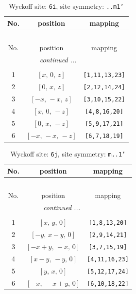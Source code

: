 \documentclass[fleqn,8pt]{jsarticle}
\begin{document}
\renewcommand{\arraystretch}{1.2}
\begin{longtable}{ccc}
\caption{Wyckoff site: {\tt 6i}, site symmetry: {\tt ..m1'}}
 \\
 \hline \hline
No. & position & mapping \\ \hline \endfirsthead

\multicolumn{2}{l}{\tablename\ \thetable{}} \\
 \hline \hline
No. & position & mapping \\ \hline \endhead

 \hline \hline
\multicolumn{2}{r}{\footnotesize\it continued ...} \\ \endfoot

 \hline \hline
\multicolumn{2}{r}{} \\ \endlastfoot

1 & $\left[ x,\, 0,\, z \right]$ & {\tt [1,11,13,23]} \\ \hline
2 & $\left[ 0,\, x,\, z \right]$ & {\tt [2,12,14,24]} \\ \hline
3 & $\left[ - x,\, - x,\, z \right]$ & {\tt [3,10,15,22]} \\ \hline
4 & $\left[ x,\, 0,\, - z \right]$ & {\tt [4,8,16,20]} \\ \hline
5 & $\left[ 0,\, x,\, - z \right]$ & {\tt [5,9,17,21]} \\ \hline
6 & $\left[ - x,\, - x,\, - z \right]$ & {\tt [6,7,18,19]} \\
\end{longtable}
\renewcommand{\arraystretch}{1.2}
\begin{longtable}{ccc}
\caption{Wyckoff site: {\tt 6j}, site symmetry: {\tt m..1'}}
 \\
 \hline \hline
No. & position & mapping \\ \hline \endfirsthead

\multicolumn{2}{l}{\tablename\ \thetable{}} \\
 \hline \hline
No. & position & mapping \\ \hline \endhead

 \hline \hline
\multicolumn{2}{r}{\footnotesize\it continued ...} \\ \endfoot

 \hline \hline
\multicolumn{2}{r}{} \\ \endlastfoot

1 & $\left[ x,\, y,\, 0 \right]$ & {\tt [1,8,13,20]} \\ \hline
2 & $\left[ - y,\, x - y,\, 0 \right]$ & {\tt [2,9,14,21]} \\ \hline
3 & $\left[ - x + y,\, - x,\, 0 \right]$ & {\tt [3,7,15,19]} \\ \hline
4 & $\left[ x - y,\, - y,\, 0 \right]$ & {\tt [4,11,16,23]} \\ \hline
5 & $\left[ y,\, x,\, 0 \right]$ & {\tt [5,12,17,24]} \\ \hline
6 & $\left[ - x,\, - x + y,\, 0 \right]$ & {\tt [6,10,18,22]} \\
\end{longtable}
\end{document}
